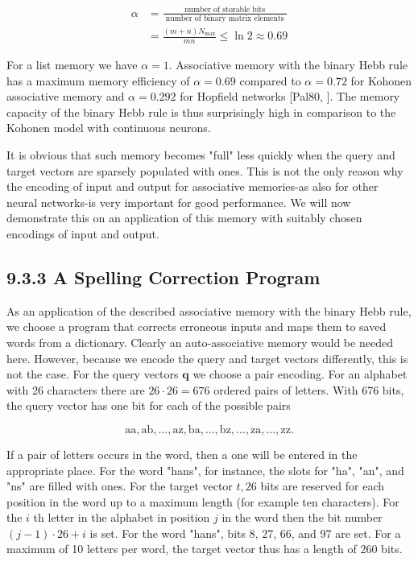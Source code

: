 \documentclass[10pt]{article}
\begin{document}
\begin{align*}
\alpha & =\frac{\text { number of storable bits }}{\text { number of binary matrix elements }}  \tag{9.11}\\
& =\frac{(m+n) N_{\max }}{m n} \leq \ln 2 \approx 0.69
\end{align*}


For a list memory we have $\alpha=1$. Associative memory with the binary Hebb rule has a maximum memory efficiency of $\alpha=0.69$ compared to $\alpha=0.72$ for Kohonen associative memory and $\alpha=0.292$ for Hopfield networks [Pal80, \cite{palm1991memory}]. The memory capacity of the binary Hebb rule is thus surprisingly high in comparison to the Kohonen model with continuous neurons.

It is obvious that such memory becomes "full" less quickly when the query and target vectors are sparsely populated with ones. This is not the only reason why the encoding of input and output for associative memories-as also for other neural networks-is very important for good performance. We will now demonstrate this on an application of this memory with suitably chosen encodings of input and output.

\subsection*{9.3.3 A Spelling Correction Program}
As an application of the described associative memory with the binary Hebb rule, we choose a program that corrects erroneous inputs and maps them to saved words from a dictionary. Clearly an auto-associative memory would be needed here. However, because we encode the query and target vectors differently, this is not the case. For the query vectors $\boldsymbol{q}$ we choose a pair encoding. For an alphabet with 26 characters there are $26 \cdot 26=676$ ordered pairs of letters. With 676 bits, the query vector has one bit for each of the possible pairs

$$
\mathrm{aa}, \mathrm{ab}, \ldots, \mathrm{az}, \mathrm{ba}, \ldots, \mathrm{bz}, \ldots, \mathrm{za}, \ldots, \mathrm{zz} .
$$

If a pair of letters occurs in the word, then a one will be entered in the appropriate place. For the word "hans", for instance, the slots for "ha", "an", and "ns" are filled with ones. For the target vector $t, 26$ bits are reserved for each position in the word up to a maximum length (for example ten characters). For the $i$ th letter in the alphabet in position $j$ in the word then the bit number $(j-1) \cdot 26+i$ is set. For the word "hans", bits 8, 27, 66, and 97 are set. For a maximum of 10 letters per word, the target vector thus has a length of 260 bits.
\end{document}
